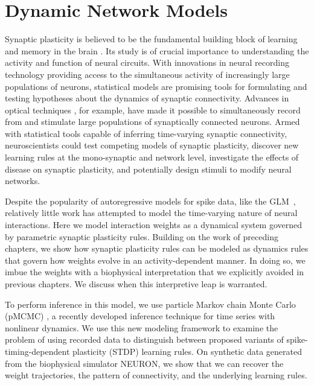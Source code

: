 
\chapter{Dynamic Network Models}
\label{chap:six}

Synaptic plasticity is believed to be the fundamental building block
of learning and memory in the brain \citep{DayanAbbott}. Its study is of crucial
importance to understanding the activity and function of neural
circuits. With innovations in neural recording technology providing
access to the simultaneous activity of increasingly large populations
of neurons, statistical models are promising tools for formulating and
testing hypotheses about the dynamics of synaptic
connectivity. Advances in optical techniques \citep{Packer-2012,
  Hochbaum-2014}, for example, have made it possible to simultaneously
record from and stimulate large populations of synaptically connected
neurons. Armed with statistical tools capable of inferring
time-varying synaptic connectivity, neuroscientists could test
competing models of synaptic plasticity, discover new learning rules
at the mono-synaptic and network level, investigate the effects of
disease on synaptic plasticity, and potentially design stimuli to
modify neural networks.

Despite the popularity of autoregressive models for spike data, like 
the GLM~\citep{Paninski-2004, Truccolo-2005, Pillow-2008},
relatively little work has attempted to model the time-varying nature
of neural interactions.  Here we model interaction weights as a
dynamical system governed by parametric synaptic plasticity rules. 
Building on the work of preceding chapters, 
we show how synaptic plasticity rules can be modeled as dynamics 
rules that govern how weights evolve in an activity-dependent manner.
In doing so, we imbue the weights with a biophysical interpretation 
that we explicitly avoided in previous chapters. We discuss when this
interpretive leap is warranted. 

To perform inference in this model, we use particle Markov chain Monte
Carlo (pMCMC) \citep{Andrieu-2010}, a recently developed inference
technique for time series with nonlinear dynamics.  We use this new
modeling framework to examine the problem of using recorded data to
distinguish between proposed variants of spike-timing-dependent
plasticity (STDP) learning rules. On synthetic data generated from the
biophysical  simulator NEURON, we show that we can recover the weight
trajectories, the pattern of connectivity, and the underlying learning
rules.

